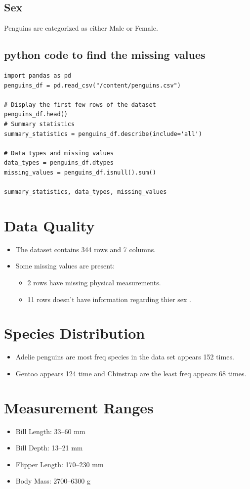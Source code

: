 \documentclass[12pt]{article}
\begin{document}
\subsection*{Sex}
Penguins are categorized as either Male or Female.
\subsection*{python code to find the missing values }
\begin{verbatim}
import pandas as pd
penguins_df = pd.read_csv("/content/penguins.csv")

# Display the first few rows of the dataset
penguins_df.head()
# Summary statistics
summary_statistics = penguins_df.describe(include='all')

# Data types and missing values
data_types = penguins_df.dtypes
missing_values = penguins_df.isnull().sum()

summary_statistics, data_types, missing_values

\end{verbatim}
\section*{Data Quality}
\begin{itemize}
    \item The dataset contains 344 rows and 7 columns.
    \item Some missing values are present:
    \begin{itemize}
        \item 2 rows have missing physical measurements.
        \item 11 rows doesn't have information regarding thier sex .
    \end{itemize}
\end{itemize}

\section*{Species Distribution}
\begin{itemize}
    \item Adelie penguins are most freq species in the data set appears 152 times.
    \item Gentoo appears 124 time and Chinstrap are the least freq appears 68 times.
\end{itemize}

\section*{Measurement Ranges}
\begin{itemize}
    \item Bill Length: 33--60 mm
    \item Bill Depth: 13--21 mm
    \item Flipper Length: 170--230 mm
    \item Body Mass: 2700--6300 g
\end{itemize}
\end{document}
